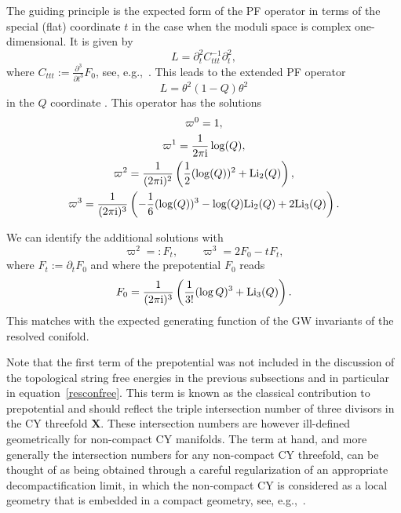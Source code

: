 \documentclass[pdftex]{sigma}
\numberwithin{equation}{section}
\begin{document}
The guiding principle is the expected form of the PF operator in terms of the special (flat) coordinate $t$ in the case when the moduli space is complex one-dimensional. It is given by
\begin{equation*}
 L = \partial_t^2 C_{ttt}^{-1} \partial_t^2,
\end{equation*}
where $C_{ttt}:=\frac{\partial^3}{\partial t^3} F_0$, see, e.g.,~\cite{Ceresole:1992su,coxkatz}. This leads to the extended PF operator
\begin{equation}\label{eq:classicalextPF}
 L= \theta^2 (1-Q) \theta^2
\end{equation}
in the $Q$ coordinate \cite{Forbes}. This operator has the solutions
\begin{gather*}%
\varpi^0 = 1,\\
\varpi^1 =\frac{1}{2\pi \mathrm{i}} \log (Q),\\
\varpi^2 =\frac{1}{(2\pi \mathrm{i})^2} \left( \frac{1}{2} (\log (Q))^2 + {\rm Li}_2(Q) \right),\\
\varpi^3 =\frac{1}{(2\pi \mathrm{i})^3}\left(- \frac{1}{6} (\log (Q))^3 -\log (Q) {\rm Li}_2(Q) +2 {\rm Li}_3(Q)\right).
\end{gather*}

We can identify the additional solutions with
\begin{equation*}
 \varpi^2=: F_t,\qquad \varpi^3= 2F_0 - t F_t,
\end{equation*}
where $F_t:=\partial_t F_0$ and where the prepotential $F_0$ reads
\begin{equation*}%
F_0 =\frac{1}{(2\pi \mathrm{i})^3}\left( \frac{1}{3!} (\log Q)^3+ {\rm Li}_3(Q)\right).
\end{equation*}
This matches with the expected generating function of the GW invariants of the resolved conifold.

Note that the first term of the prepotential was not included in the discussion of the topological string free energies in the previous subsections and in particular in equation~\eqref{resconfree}. This term is known as the classical contribution to prepotential and should reflect the triple intersection number of three divisors in the CY threefold $\mathbf{X}$. These intersection numbers are however ill-defined geometrically for non-compact CY manifolds. The term at hand, and more generally the intersection numbers for any non-compact CY threefold, can be thought of as being obtained through a careful regularization of an appropriate decompactification limit, in which the non-compact CY is considered as a local geometry that is embedded in a compact geometry, see, e.g.,~\cite{Chianglocal}.
\end{document}
